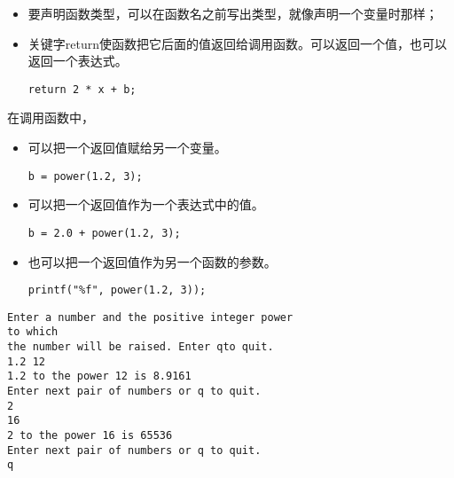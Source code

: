 \begin{frame}[fragile]\ft{\secname}
\begin{itemize}
\item 要声明函数类型，可以在函数名之前写出类型，就像声明一个变量时那样；\\[0.1in]
\item 关键字return使函数把它后面的值返回给调用函数。可以返回一个值，也可以返回一个表达式。
\begin{lstlisting}
return 2 * x + b;
\end{lstlisting}
\end{itemize}
\end{frame}


\begin{frame}[fragile]\ft{\secname}
在调用函数中，\vspace{0.1in}

\begin{itemize}
\item 可以把一个返回值赋给另一个变量。
\begin{lstlisting}
b = power(1.2, 3);
\end{lstlisting}
\item 可以把一个返回值作为一个表达式中的值。
\begin{lstlisting}
b = 2.0 + power(1.2, 3);
\end{lstlisting}
\item 也可以把一个返回值作为另一个函数的参数。
\begin{lstlisting}
printf("%f", power(1.2, 3));
\end{lstlisting}
\end{itemize}
\end{frame}

\begin{frame}

\end{frame}


\begin{frame}[fragile]
\begin{lstlisting}
Enter a number and the positive integer power
to which
the number will be raised. Enter qto quit.
1.2 12
1.2 to the power 12 is 8.9161
Enter next pair of numbers or q to quit.
2
16
2 to the power 16 is 65536
Enter next pair of numbers or q to quit.
q
\end{lstlisting}

\end{frame}
